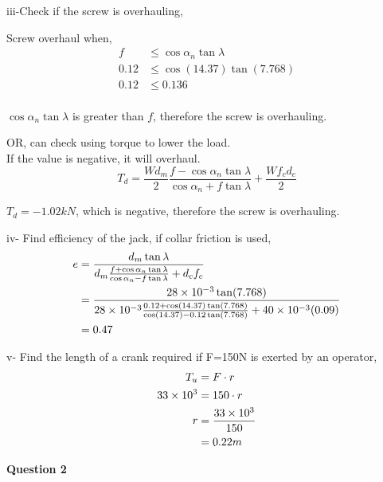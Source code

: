 \documentclass[a4paper, fleqn]{article}
\providecommand{\sci}[1]{\protect\ensuremath{\times 10^{\StrSubstitute[0]{#1}{e}{}}}}
\begin{document}
iii-Check if the screw is overhauling,

Screw overhaul when,
\begin{equation*}
    \begin{aligned}
    f &\le \cos \alpha_n \tan \lambda \\
    0.12 &\le \cos(14.37) \tan(7.768)\\
    0.12 &\le 0.136\\
    \end{aligned}
\end{equation*}

$\cos \alpha_n \tan \lambda$ is greater than $f$, therefore the screw is overhauling.
\vspace{10pt}

OR, can check using torque to lower the load. \\
If the value is negative, it will overhaul.
$$T_d = \frac{Wd_m}{2} \frac{f-\cos\alpha_n \tan\lambda}{\cos\alpha_n + f\tan\lambda} + \frac{Wf_c d_c}{2}$$

$T_d=-1.02kN$, which is negative, therefore the screw is overhauling.
\vspace{10pt}

iv- Find efficiency of the jack, if collar friction is used,
\begin{equation*}
    \begin{aligned}
    e &=\frac{d_m \tan \lambda}{d_m \frac{f+\cos\alpha_n \tan\lambda}{\cos\alpha_n - f\tan\lambda}+d_c f_c} \\
    &=\frac{28\sci{e-3} \tan(7.768)}{28\sci{e-3} \frac{0.12+\cos(14.37) \tan(7.768)}{\cos(14.37) - 0.12\tan(7.768)}+40\sci{e-3} (0.09)} \\
    &=0.47
    \end{aligned}
\end{equation*}

v- Find the length of a crank required if F=150N is exerted by an operator,
\begin{equation*}
    \begin{aligned}
    T_u &= F \cdot r\\
    33\sci{e3} &= 150 \cdot r\\
    r &= \frac{33\sci{e3}}{150}\\
    &= 0.22 m
    \end{aligned}
\end{equation*}

\newpage
\textbf{Question 2}
\end{document}
